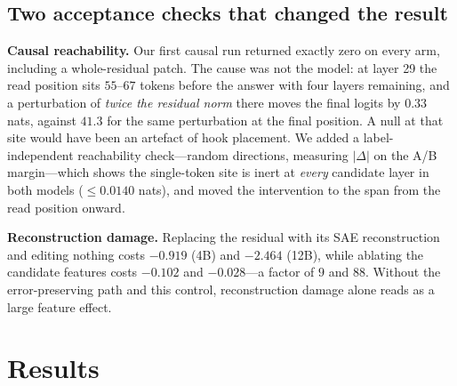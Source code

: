 \documentclass[conference]{IEEEtran}
\begin{document}
\subsection{Two acceptance checks that changed the result}
\textbf{Causal reachability.} Our first causal run returned exactly zero on every arm, including a
whole-residual patch. The cause was not the model: at layer 29 the read position sits $55$--$67$
tokens before the answer with four layers remaining, and a perturbation of \emph{twice the residual
norm} there moves the final logits by $0.33$ nats, against $41.3$ for the same perturbation at the
final position. A null at that site would have been an artefact of hook placement. We added a
label-independent reachability check---random directions, measuring $|\Delta|$ on the A/B
margin---which shows the single-token site is inert at \emph{every} candidate layer in both models
($\le0.0140$ nats), and moved the intervention to the span from the read position onward.

\textbf{Reconstruction damage.} Replacing the residual with its SAE reconstruction and editing
nothing costs $-0.919$ (4B) and $-2.464$ (12B), while ablating the candidate features costs $-0.102$
and $-0.028$---a factor of $9$ and $88$. Without the error-preserving path and this control, reconstruction damage alone reads
as a large feature effect.

\section{Results}
\label{sec:results}
\end{document}
